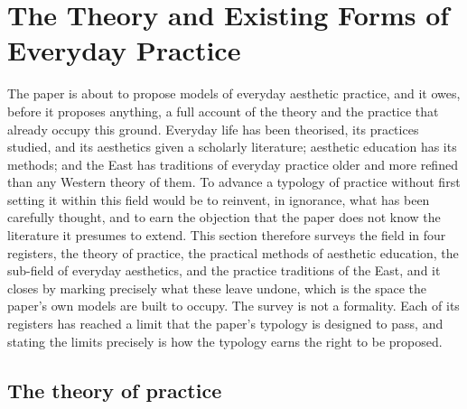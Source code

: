 \section{The Theory and Existing Forms of Everyday Practice}
\label{p23:sec:practicefield}

\noindent
The paper is about to propose models of everyday aesthetic practice, and it owes, before it proposes anything, a full account of the theory and the practice that already occupy this ground. Everyday life has been theorised, its practices studied, and its aesthetics given a scholarly literature; aesthetic education has its methods; and the East has traditions of everyday practice older and more refined than any Western theory of them. To advance a typology of practice without first setting it within this field would be to reinvent, in ignorance, what has been carefully thought, and to earn the objection that the paper does not know the literature it presumes to extend. This section therefore surveys the field in four registers, the theory of practice, the practical methods of aesthetic education, the sub-field of everyday aesthetics, and the practice traditions of the East, and it closes by marking precisely what these leave undone, which is the space the paper's own models are built to occupy. The survey is not a formality. Each of its registers has reached a limit that the paper's typology is designed to pass, and stating the limits precisely is how the typology earns the right to be proposed.

\subsection{The theory of practice}
\label{p23:sub:field-practicetheory}

